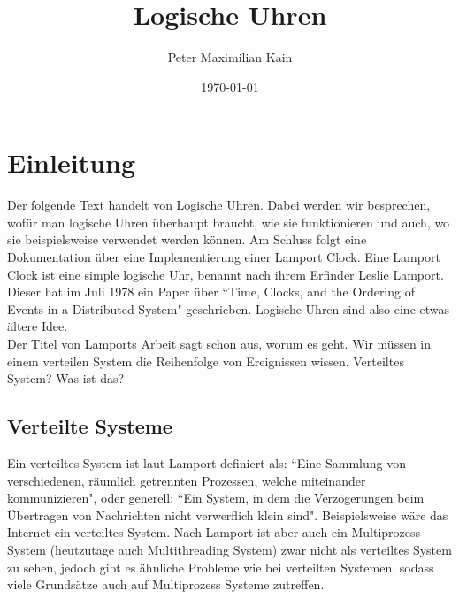 \documentclass[a4paper,11pt]{report}
\title{Logische Uhren}
\author{Peter Maximilian Kain}
\date{\today}
\begin{document}
\maketitle

\tableofcontents
\newpage

\chapter{Einleitung}
Der folgende Text handelt von Logische Uhren. Dabei werden wir besprechen, wofür man logische Uhren überhaupt braucht, wie sie funktionieren und auch, wo sie beispielsweise verwendet werden können. Am Schluss folgt eine Dokumentation über eine Implementierung einer Lamport Clock. Eine Lamport Clock ist eine simple logische Uhr, benannt nach ihrem Erfinder Leslie Lamport. Dieser hat im Juli 1978 ein Paper über ``Time, Clocks, and the Ordering of Events in a Distributed System" geschrieben. Logische Uhren sind also eine etwas ältere Idee.\\
Der Titel von Lamports Arbeit sagt schon aus, worum es geht. Wir müssen in einem verteilen System die Reihenfolge von Ereignissen wissen. Verteiltes System? Was ist das?
\section{Verteilte Systeme}
Ein verteiltes System ist laut Lamport definiert als: ``Eine Sammlung von verschiedenen, räumlich getrennten Prozessen, welche miteinander kommunizieren", oder generell: ``Ein System, in dem die Verzögerungen beim Übertragen von Nachrichten nicht verwerflich klein sind". Beispielsweise wäre das Internet ein verteiltes System. Nach Lamport ist aber auch ein Multiprozess System (heutzutage auch Multithreading System) zwar nicht als verteiltes System zu sehen, jedoch gibt es ähnliche Probleme wie bei verteilten Systemen, sodass viele Grundsätze auch auf Multiprozess Systeme zutreffen.
\end{document}
